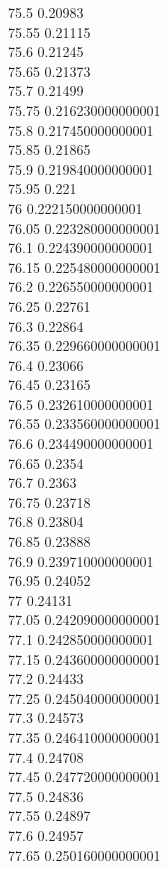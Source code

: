{75.5	0.20983\\
75.55	0.21115\\
75.6	0.21245\\
75.65	0.21373\\
75.7	0.21499\\
75.75	0.216230000000001\\
75.8	0.217450000000001\\
75.85	0.21865\\
75.9	0.219840000000001\\
75.95	0.221\\
76	0.222150000000001\\
76.05	0.223280000000001\\
76.1	0.224390000000001\\
76.15	0.225480000000001\\
76.2	0.226550000000001\\
76.25	0.22761\\
76.3	0.22864\\
76.35	0.229660000000001\\
76.4	0.23066\\
76.45	0.23165\\
76.5	0.232610000000001\\
76.55	0.233560000000001\\
76.6	0.234490000000001\\
76.65	0.2354\\
76.7	0.2363\\
76.75	0.23718\\
76.8	0.23804\\
76.85	0.23888\\
76.9	0.239710000000001\\
76.95	0.24052\\
77	0.24131\\
77.05	0.242090000000001\\
77.1	0.242850000000001\\
77.15	0.243600000000001\\
77.2	0.24433\\
77.25	0.245040000000001\\
77.3	0.24573\\
77.35	0.246410000000001\\
77.4	0.24708\\
77.45	0.247720000000001\\
77.5	0.24836\\
77.55	0.24897\\
77.6	0.24957\\
77.65	0.250160000000001\\
}
